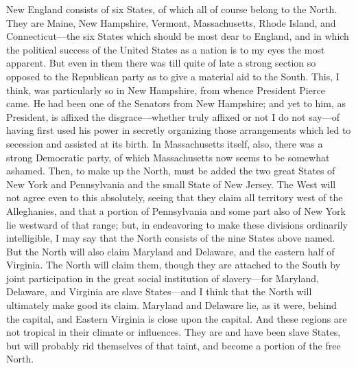 New England consists of six States, of which all of course belong
to the North.  They are Maine, New Hampshire, Vermont,
Massachusetts, Rhode Island, and Connecticut---the six States which
should be most dear to England, and in which the political success
of the United States as a nation is to my eyes the most apparent.
But even in them there was till quite of late a strong section so
opposed to the Republican party as to give a material aid to the
South.  This, I think, was particularly so in New Hampshire, from
whence President Pierce came.  He had been one of the Senators from
New Hampshire; and yet to him, as President, is affixed the
disgrace---whether truly affixed or not I do not say---of having
first used his power in secretly organizing those arrangements
which led to secession and assisted at its birth.  In Massachusetts
itself, also, there was a strong Democratic party, of which
Massachusetts now seems to be somewhat ashamed.  Then, to make up
the North, must be added the two great States of New York and
Pennsylvania and the small State of New Jersey.  The West will not
agree even to this absolutely, seeing that they claim all territory
west of the Alleghanies, and that a portion of Pennsylvania and
some part also of New York lie westward of that range; but, in
endeavoring to make these divisions ordinarily intelligible, I may
say that the North consists of the nine States above named.  But
the North will also claim Maryland and Delaware, and the eastern
half of Virginia.  The North will claim them, though they are
attached to the South by joint participation in the great social
institution of slavery---for Maryland, Delaware, and Virginia are
slave States---and I think that the North will ultimately make good
its claim.  Maryland and Delaware lie, as it were, behind the
capital, and Eastern Virginia is close upon the capital.  And these
regions are not tropical in their climate or influences.  They are
and have been slave States, but will probably rid themselves of
that taint, and become a portion of the free North.

